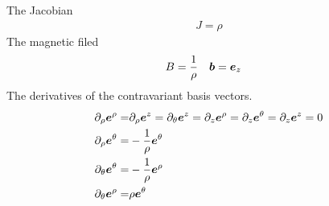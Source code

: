 %
The Jacobian
%
\begin{align*}
    J=\rho
\end{align*}
%
The magnetic filed
%
\begin{align*}
    &B = \frac{1}{\rho}&
    & \boldsymbol{b}= \boldsymbol{e}_z
\end{align*}
%
The derivatives of the contravariant basis vectors.
\begin{align*}
    \partial_\rho \boldsymbol{e}^\rho =&
    \partial_\rho \boldsymbol{e}^z =
    \partial_\theta \boldsymbol{e}^z =
    \partial_z \boldsymbol{e}^\rho =
    \partial_z \boldsymbol{e}^\theta =
    \partial_z \boldsymbol{e}^z = 0
    \\
    \partial_\rho \boldsymbol{e}^\theta =& - \frac{1}{\rho} \boldsymbol{e}^\theta
    \\
    \partial_\theta \boldsymbol{e}^\theta =& - \frac{1}{\rho} \boldsymbol{e}^\rho
    \\
    \partial_\theta \boldsymbol{e}^\rho =& \rho \boldsymbol{e}^\theta
\end{align*}
